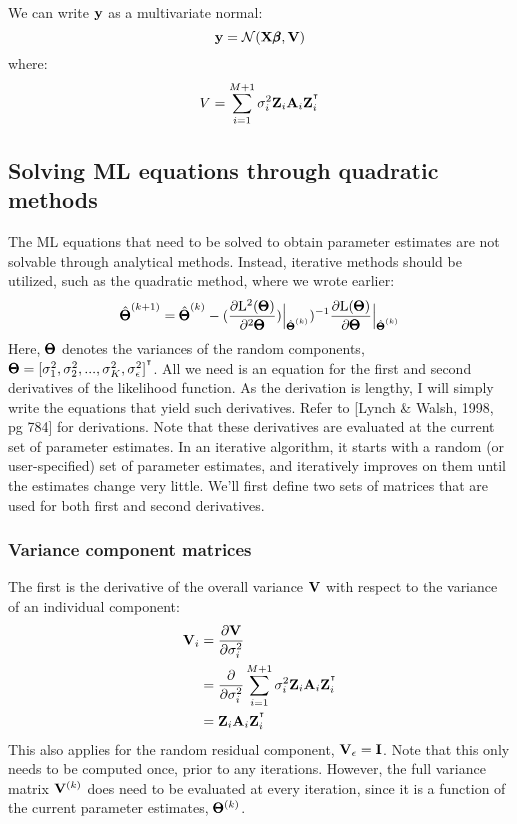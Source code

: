 \documentclass[12pt]{article}
\begin{document}
We can write $\mathbf{y}$ as a multivariate normal:
$$ \mathbf{y} = \mathcal{N}(\mathbf{X} \pmb{\beta}, \mathbf{V}) $$
where:
$$ V = \sum_{i=1}^{M+1} \sigma^2_i \mathbf{Z}_i \mathbf{A}_i \mathbf{Z}_i^{^\intercal} $$

\subsection{Solving ML equations through quadratic methods}
The ML equations that need to be solved to obtain parameter estimates are not solvable through analytical methods.
Instead, iterative methods should be utilized, such as the quadratic method, where we wrote earlier:
$$
\hat{\pmb{\Theta}}^{(k+1)} = 
\hat{\pmb{\Theta}}^{(k)} -
(\frac{\partial \mathrm{L}^2(\pmb{\Theta})}{\partial^2 \pmb{\Theta}})
\Bigr|_{\hat{\pmb{\Theta}}^{(k)} })^{-1} 
\frac{\partial \mathrm{L}(\pmb{\Theta})}{\partial \pmb{\Theta}}
\Bigr|_{\hat{\pmb{\Theta}}^{(k)} }
$$
Here, $\pmb{\Theta}$ denotes the variances of the random components, $\pmb{\Theta} = [ \sigma^2_1, \sigma^2_2, ... , \sigma^2_K, \sigma^2_{\epsilon} ]^{^\intercal}$.
All we need is an equation for the first and second derivatives of the likelihood function.
As the derivation is lengthy, I will simply write the equations that yield such derivatives.
Refer to [Lynch \& Walsh, 1998, pg 784] for derivations.
Note that these derivatives are evaluated at the current set of parameter estimates.
In an iterative algorithm, it starts with a random (or user-specified) set of parameter estimates, and iteratively improves on them until the estimates change very little.
We'll first define two sets of matrices that are used for both first and second derivatives.

\subsubsection{Variance component matrices}
The first is the derivative of the overall variance $\mathbf{V}$ with respect to the variance of an individual component:
\begin{align*}
    \mathbf{V}_i &= \frac{\partial \mathbf{V}}{\partial \sigma^2_i} \\
    &= \frac{\partial}{\partial \sigma^2_i}
    \sum_{i=1}^{M+1} \sigma^2_i \mathbf{Z}_i \mathbf{A}_i \mathbf{Z}_i^{^\intercal} \\
    &= \mathbf{Z}_i \mathbf{A}_i \mathbf{Z}_i^{^\intercal}
\end{align*}
This also applies for the random residual component, $\mathbf{V}_{\epsilon} = \mathbf{I}$.
Note that this only needs to be computed once, prior to any iterations.
However, the full variance matrix $\mathbf{V}^{(k)}$ does need to be evaluated at every iteration, since it is a function of the current parameter estimates, $\pmb{\Theta}^{(k)}$.
\end{document}
